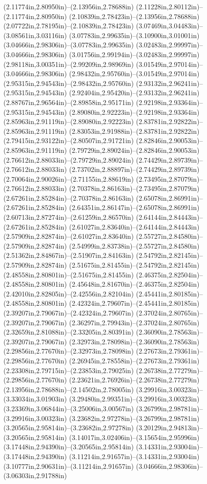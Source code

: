 (2.11774in,2.80950in)--(2.13956in,2.78688in) (2.11228in,2.80112in)--(2.11774in,2.80950in) (2.10839in,2.78423in)--(2.13956in,2.78688in) (2.07722in,2.78195in)--(2.10839in,2.78423in) (3.07469in,3.04483in)--(3.08561in,3.03116in) (3.07783in,2.99635in)--(3.10900in,3.01001in) (3.04666in,2.98306in)--(3.07783in,2.99635in) (3.02483in,2.99997in)--(3.04666in,2.98306in) (3.01756in,2.99194in)--(3.02483in,2.99997in) (2.98118in,3.00351in)--(2.99209in,2.98969in) (3.01549in,2.97014in)--(3.04666in,2.98306in) (2.98432in,2.95760in)--(3.01549in,2.97014in) (2.95315in,2.94543in)--(2.98432in,2.95760in) (2.93132in,2.96241in)--(2.95315in,2.94543in) (2.92404in,2.95420in)--(2.93132in,2.96241in) (2.88767in,2.96564in)--(2.89858in,2.95171in) (2.92198in,2.93364in)--(2.95315in,2.94543in) (2.89080in,2.92223in)--(2.92198in,2.93364in) (2.85963in,2.91119in)--(2.89080in,2.92223in) (2.83781in,2.92822in)--(2.85963in,2.91119in) (2.83053in,2.91988in)--(2.83781in,2.92822in) (2.79415in,2.93122in)--(2.80507in,2.91721in) (2.82846in,2.90053in)--(2.85963in,2.91119in) (2.79729in,2.89024in)--(2.82846in,2.90053in) (2.76612in,2.88033in)--(2.79729in,2.89024in) (2.74429in,2.89739in)--(2.76612in,2.88033in) (2.73702in,2.88897in)--(2.74429in,2.89739in) (2.70064in,2.90026in)--(2.71155in,2.88619in) (2.73495in,2.87079in)--(2.76612in,2.88033in) (2.70378in,2.86163in)--(2.73495in,2.87079in) (2.67261in,2.85284in)--(2.70378in,2.86163in) (2.65078in,2.86991in)--(2.67261in,2.85284in) (2.64351in,2.86147in)--(2.65078in,2.86991in) (2.60713in,2.87274in)--(2.61259in,2.86570in) (2.64144in,2.84443in)--(2.67261in,2.85284in) (2.61027in,2.83640in)--(2.64144in,2.84443in) (2.57909in,2.82874in)--(2.61027in,2.83640in) (2.55727in,2.84580in)--(2.57909in,2.82874in) (2.54999in,2.83738in)--(2.55727in,2.84580in) (2.51362in,2.84867in)--(2.51907in,2.84163in) (2.54792in,2.82145in)--(2.57909in,2.82874in) (2.51675in,2.81455in)--(2.54792in,2.82145in) (2.48558in,2.80801in)--(2.51675in,2.81455in) (2.46375in,2.82504in)--(2.48558in,2.80801in) (2.45648in,2.81670in)--(2.46375in,2.82504in) (2.42010in,2.82805in)--(2.42556in,2.82104in) (2.45441in,2.80185in)--(2.48558in,2.80801in) (2.42324in,2.79607in)--(2.45441in,2.80185in) (2.39207in,2.79067in)--(2.42324in,2.79607in) (2.37024in,2.80765in)--(2.39207in,2.79067in) (2.36297in,2.79943in)--(2.37024in,2.80765in) (2.32659in,2.81088in)--(2.33205in,2.80391in) (2.36090in,2.78563in)--(2.39207in,2.79067in) (2.32973in,2.78098in)--(2.36090in,2.78563in) (2.29856in,2.77670in)--(2.32973in,2.78098in) (2.27673in,2.79361in)--(2.29856in,2.77670in) (2.26945in,2.78558in)--(2.27673in,2.79361in) (2.23308in,2.79715in)--(2.23853in,2.79025in) (2.26738in,2.77279in)--(2.29856in,2.77670in) (2.23621in,2.76926in)--(2.26738in,2.77279in) (2.13956in,2.78688in)--(2.14502in,2.78005in) (3.29916in,3.00323in)--(3.33034in,3.01903in) (3.29480in,2.99351in)--(3.29916in,3.00323in) (3.23369in,3.06844in)--(3.25006in,3.00567in) (3.26799in,2.98781in)--(3.29916in,3.00323in) (3.23682in,2.97278in)--(3.26799in,2.98781in) (3.20565in,2.95814in)--(3.23682in,2.97278in) (3.20129in,2.94813in)--(3.20565in,2.95814in) (3.14017in,3.02406in)--(3.15654in,2.95996in) (3.17448in,2.94390in)--(3.20565in,2.95814in) (3.14331in,2.93004in)--(3.17448in,2.94390in) (3.11214in,2.91657in)--(3.14331in,2.93004in) (3.10777in,2.90631in)--(3.11214in,2.91657in) (3.04666in,2.98306in)--(3.06303in,2.91788in) 